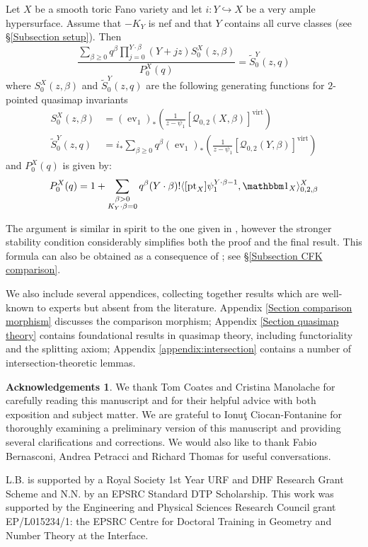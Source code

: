 \documentclass[11pt]{amsart}
\newcommand{\Q}[4]{\mathcal{Q}_{#1,#2}(#3,#4)}
\newcommand{\virt}[1]{[#1]^{\operatorname{virt}}}
\newcommand{\pt}{\operatorname{pt}}
\newcommand{\ev}{\operatorname{ev}}
\theoremstyle{definition}
\newenvironment{customthm}[1]
  {\renewcommand\theinnercustomthm{#1}\innercustomthm}
  {\endinnercustomthm}
\theoremstyle{definition}
\newtheorem*{acknowledgements}{Acknowledgements}
\begin{document}
\begin{customthm}{\ref{Theorem Quantum Lefschetz}}
Let $X$ be a smooth toric Fano variety and let $i\colon Y \hookrightarrow X$ be a very ample hypersurface. Assume that $-K_Y$ is nef and that $Y$ contains all curve classes (see \S \ref{Subsection setup}). Then
\begin{equation*}
\dfrac{\sum_{\beta\geq 0} q^\beta\prod_{j=0}^{Y\cdot\beta}(Y+jz)S_0^X(z,\beta)}{P_0^X(q)}= \tilde{S}_0^Y(z,q)
\end{equation*}
where $S_0^X(z,\beta)$ and $\tilde{S}_0^Y(z,q)$ are the following generating functions for $2$-pointed quasimap invariants
\begin{align*}
S_0^X(z,\beta)&=(\ev_1)_*\left(\frac{1}{z-\psi_1} \virt{\Q{0}{2}{X}{\beta}}\right) \\
\tilde{S}_0^Y(z,q)&=i_* \sum_{\beta \geq 0} q^\beta (\ev_1)_*\left(\frac{1}{z-\psi_1} \virt{\Q{0}{2}{Y}{\beta}}\right)
\end{align*}
and $P_0^X(q)$ is given by:
\begin{equation*}
P_0^X(q) = 1 + \sum_{\substack{\beta>0 \\ K_Y\cdot\beta=0}} q^\beta(Y\cdot\beta)!\langle [\pt_X] \psi_1^{Y\cdot\beta-1} ,\mathbbm 1_{X}\rangle_{0,2,\beta}^X
\end{equation*}
\end{customthm}

The argument is similar in spirit to the one given in \cite{Ga-MF}, however the stronger stability condition considerably simplifies both the proof and the final result. This formula can also be obtained as a consequence of \cite[Corollary~5.5.1]{CF-K-wallcrossing}; see \S \ref{Subsection CFK comparison}. 

We also include several appendices, collecting together results which are well-known to experts but absent from the literature. Appendix \ref{Section comparison morphism} discusses the comparison morphism; Appendix \ref{Section quasimap theory} contains foundational results in quasimap theory, including functoriality and the splitting axiom; Appendix \ref{appendix:intersection} contains a number of intersection-theoretic lemmas.

\begin{acknowledgements} We thank Tom Coates and Cristina Manolache for carefully reading this manuscript and for their helpful advice with both exposition and subject matter. We are grateful to Ionu\c{t} Ciocan-Fontanine for thoroughly examining a preliminary version of this manuscript and providing several clarifications and corrections. We would also like to thank Fabio Bernasconi, Andrea Petracci and Richard Thomas for useful conversations. 

L.B. is supported by a Royal Society 1st Year URF and DHF Research Grant Scheme and N.N. by an EPSRC Standard DTP Scholarship.
This work was supported by the Engineering and Physical Sciences Research Council grant EP/L015234/1: the EPSRC Centre for Doctoral Training in Geometry and Number Theory at the Interface.
\end{acknowledgements}
\end{document}
